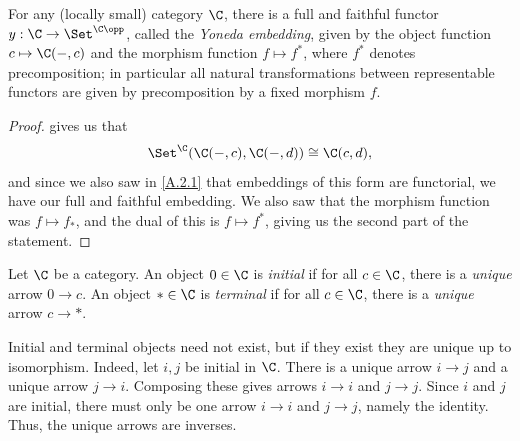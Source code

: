 \begin{lemma}[Yoneda]\label{A.2.2}
    For any (locally small) category $\C$, there is a full and faithful functor $y:\C\to\Set^{\C\opp}$, called the \emph{Yoneda embedding}, given by the object function $c\mapsto\C(-,c)$ and the morphism function $f\mapsto f^*$, where $f^*$ denotes precomposition; in particular all natural transformations between representable functors are given by precomposition by a fixed morphism $f$.
\end{lemma}
\begin{proof}
     gives us that 
    \[
    \Set^\C(\C(-,c),\C(-,d))\cong\C(c,d),
    \]
    and since we also saw in \cref{A.2.1} that embeddings of this form are functorial, we have our full and faithful embedding. We also saw that the morphism function was $f\mapsto f_*$, and the dual of this is $f\mapsto f^*$, giving us the second part of the statement.
\end{proof}

\begin{definition}\label{A.2.3}
    Let $\C$ be a category. An object $0\in\C$ is \emph{initial} if for all $c\in\C$, there is a \emph{unique} arrow $0\to c$. An object $*\in\C$ is \emph{terminal} if for all $c\in\C$, there is a \emph{unique} arrow $c\to*$.
\end{definition}

\begin{remark}\label{A.2.4}
    Initial and terminal objects need not exist, but if they exist they are unique up to isomorphism. Indeed, let $i,j$ be initial in $\C$. There is a unique arrow $i\to j$ and a unique arrow $j\to i$. Composing these gives arrows $i\to i$ and $j\to j$. Since $i$ and $j$ are initial, there must only be one arrow $i\to i$ and $j\to j$, namely the identity. Thus, the unique arrows are inverses.
\end{remark}


